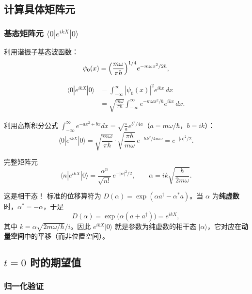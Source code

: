 \subsection{计算具体矩阵元}

\subsubsection{基态矩阵元 $\langle 0|e^{ikX}|0\rangle$}

利用谐振子基态波函数：
\[
  \psi_0(x) = \Bigl(\frac{m\omega}{\pi\hbar}\Bigr)^{1/4} e^{-m\omega x^2/2\hbar},
\]

\begin{align*}
  \langle 0|e^{ikX}|0\rangle
  &= \int_{-\infty}^{\infty} |\psi_0(x)|^2 e^{ikx}\,dx \\
  &= \sqrt{\frac{m\omega}{\pi\hbar}} \int_{-\infty}^{\infty} e^{-m\omega x^2/\hbar} e^{ikx}\,dx.
\end{align*}

利用高斯积分公式 $\displaystyle\int_{-\infty}^{\infty} e^{-ax^2+bx}dx = \sqrt{\frac{\pi}{a}}e^{b^2/4a}$（$a=m\omega/\hbar$，$b=ik$）：
\[
  \langle 0|e^{ikX}|0\rangle
  = \sqrt{\frac{m\omega}{\pi\hbar}} \cdot \sqrt{\frac{\pi\hbar}{m\omega}}\,
    e^{-\hbar k^2/4m\omega}
  = e^{-|\alpha|^2/2}.
\]

\begin{formulabox}{完整矩阵元}
\[
  \boxed{\langle n|e^{ikX}|0\rangle = \frac{\alpha^n}{\sqrt{n!}}\,e^{-|\alpha|^2/2}},
  \qquad \alpha = ik\sqrt{\frac{\hbar}{2m\omega}}.
\]
\end{formulabox}

\begin{insightbox}{这是相干态！}
标准的位移算符为 $D(\alpha)=\exp(\alpha a^\dagger - \alpha^* a)$。当 $\alpha$ 为\textbf{纯虚数}时，$\alpha^*=-\alpha$，于是
\[
  D(\alpha) = \exp\bigl(\alpha(a+a^\dagger)\bigr) = e^{ikX},
\]
其中 $k = \alpha\sqrt{2m\omega/\hbar}/i$。因此 $e^{ikX}|0\rangle$ 就是参数为纯虚数的相干态 $|\alpha\rangle$，它对应在\textbf{动量空间}中的平移（而非位置空间）。
\end{insightbox}


\subsection{$t=0$ 时的期望值}

\subsubsection{归一化验证}

